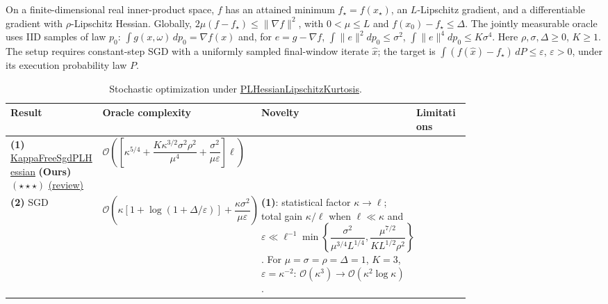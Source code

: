 \begin{table}[tp]
\centering
\caption{Stochastic optimization under \href{https://github.com/k3nfalt/longtails/blob/main/LongTails/Setups/PLHessianLipschitzKurtosis.lean}{PLHessianLipschitzKurtosis}.}\label{tab:PLHessianLipschitzKurtosis}
\parbox{\linewidth}{\footnotesize On a finite-dimensional real inner-product space, $f$ has an attained minimum $f_\star=f(x_\star)$, an $L$-Lipschitz gradient, and a differentiable gradient with $\rho$-Lipschitz Hessian. Globally, $2\mu(f-f_\star)\leq\|\nabla f\|^2$, with $0<\mu\leq L$ and $f(x_0)-f_\star\leq\Delta$. The jointly measurable oracle uses IID samples of law $p_0$: $\int g(x,\omega)\,dp_0=\nabla f(x)$ and, for $e=g-\nabla f$, $\int\|e\|^2dp_0\leq\sigma^2$, $\int\|e\|^4dp_0\leq K\sigma^4$. Here $\rho,\sigma,\Delta\geq0$, $K\geq1$. The setup requires constant-step SGD with a uniformly sampled final-window iterate $\hat x$; the target is $\int(f(\hat x)-f_\star)\,dP\leq\varepsilon$, $\varepsilon>0$, under its execution probability law $P$.}\par\smallskip
\begin{threeparttable}
\footnotesize
\setlength{\tabcolsep}{4pt}\renewcommand{\arraystretch}{1.25}
\begin{tabularx}{\linewidth}{@{}>{\raggedright\arraybackslash}p{0.20\linewidth}>{\raggedright\arraybackslash}p{0.32\linewidth}>{\raggedright\arraybackslash}p{0.25\linewidth}>{\raggedright\arraybackslash}X@{}}
\toprule
\textbf{Result} & \textbf{Oracle complexity} & \textbf{Novelty} & \textbf{Limitations} \\
\midrule
\textbf{(1)} \href{https://github.com/k3nfalt/longtails/blob/main/LongTails/Theorems/KappaFreeSgdPLHessian.lean}{Kappa\allowbreak Free\allowbreak Sgd\allowbreak PL\allowbreak Hessian} \textbf{(Ours)} $(\star\star\star)$ \href{https://github.com/k3nfalt/longtails/blob/main/scripts/reviews/KappaFreeSgdPLHessian.md}{(review)}
& $\mathcal{O}\!\left(\left[\kappa^{5/4}+\dfrac{K\kappa^{3/2}\sigma^2\rho^2}{\mu^4}+\dfrac{\sigma^2}{\mu\varepsilon}\right]\ell\right)$ & & \\
\midrule[1.2pt]
\textbf{(2)} SGD \citep[Thm.~3, Cor.~2]{avmKhaledRichtarik2020v3}
& $\mathcal{O}\!\left(\kappa[1+\log(1+\Delta/\varepsilon)]+\dfrac{\kappa\sigma^2}{\mu\varepsilon}\right)$
& \textbf{(1)}: statistical factor $\kappa\to\ell$; total gain $\kappa/\ell$ when $\ell\ll\kappa$ and $\varepsilon\ll\ell^{-1}\min\!\left\{\dfrac{\sigma^2}{\mu^{3/4}L^{1/4}},\dfrac{\mu^{7/2}}{K L^{1/2}\rho^2}\right\}$. For $\mu=\sigma=\rho=\Delta=1$, $K=3$, $\varepsilon=\kappa^{-2}$: $\mathcal{O}(\kappa^3)\to\mathcal{O}(\kappa^2\log\kappa)$.

\end{tabularx}
\end{threeparttable}
\end{table}
